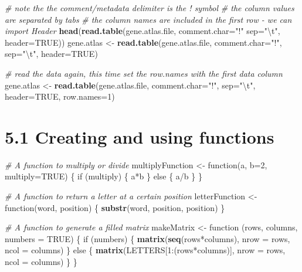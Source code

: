 \documentclass[a4paper]{book}
\newenvironment{Shaded}{\begin{snugshade}}{\end{snugshade}}
\newcommand{\KeywordTok}[1]{\textcolor[rgb]{0.13,0.29,0.53}{\textbf{{#1}}}}
\newcommand{\DataTypeTok}[1]{\textcolor[rgb]{0.13,0.29,0.53}{{#1}}}
\newcommand{\DecValTok}[1]{\textcolor[rgb]{0.00,0.00,0.81}{{#1}}}
\newcommand{\CharTok}[1]{\textcolor[rgb]{0.31,0.60,0.02}{{#1}}}
\newcommand{\StringTok}[1]{\textcolor[rgb]{0.31,0.60,0.02}{{#1}}}
\newcommand{\CommentTok}[1]{\textcolor[rgb]{0.56,0.35,0.01}{\textit{{#1}}}}
\newcommand{\OtherTok}[1]{\textcolor[rgb]{0.56,0.35,0.01}{{#1}}}
\newcommand{\NormalTok}[1]{{#1}}
\renewenvironment{Shaded}
{\vspace{1.5em}\begin{leftbar}\begin{snugshade}}
{\end{snugshade}\end{leftbar}\vspace{3pt}}
\begin{document}
\begin{Shaded}
\begin{Highlighting}[]
\CommentTok{# note the the comment/metadata delimiter is the ! symbol}
\CommentTok{# the column values are separated by tabs}
\CommentTok{# the column names are included in the first row - we can import Header}
\KeywordTok{head}\NormalTok{(}\KeywordTok{read.table}\NormalTok{(gene.atlas.file, }\DataTypeTok{comment.char=}\StringTok{"!"} \DataTypeTok{sep=}\StringTok{"}\CharTok{\textbackslash{}t}\StringTok{"}\NormalTok{, }\DataTypeTok{header=}\OtherTok{TRUE}\NormalTok{))}
\NormalTok{gene.atlas <-}\StringTok{ }\KeywordTok{read.table}\NormalTok{(gene.atlas.file, }\DataTypeTok{comment.char=}\StringTok{"!"}\NormalTok{, }\DataTypeTok{sep=}\StringTok{"}\CharTok{\textbackslash{}t}\StringTok{"}\NormalTok{, }\DataTypeTok{header=}\OtherTok{TRUE}\NormalTok{)}

\CommentTok{# read the data again, this time set the row.names with the first data column}
\NormalTok{gene.atlas <-}\StringTok{ }\KeywordTok{read.table}\NormalTok{(gene.atlas.file, }\DataTypeTok{comment.char=}\StringTok{"!"}\NormalTok{, }\DataTypeTok{sep=}\StringTok{"}\CharTok{\textbackslash{}t}\StringTok{"}\NormalTok{,}
                         \DataTypeTok{header=}\OtherTok{TRUE}\NormalTok{, }\DataTypeTok{row.names=}\DecValTok{1}\NormalTok{)}
\end{Highlighting}
\end{Shaded}

\section*{5.1 Creating and using
functions}\label{creating-and-using-functions}

\begin{Shaded}
\begin{Highlighting}[]
\CommentTok{# A function to multiply or divide}
\NormalTok{multiplyFunction <-}\StringTok{ }\NormalTok{function(a, }\DataTypeTok{b=}\DecValTok{2}\NormalTok{, }\DataTypeTok{multiply=}\OtherTok{TRUE}\NormalTok{) \{}
  \NormalTok{if (multiply) \{}
    \NormalTok{a*b}
  \NormalTok{\} else \{}
    \NormalTok{a/b}
  \NormalTok{\}}
\NormalTok{\}}

\CommentTok{# A function to return a letter at a certain position}
\NormalTok{letterFunction <-}\StringTok{ }\NormalTok{function(word, position) \{}
  \KeywordTok{substr}\NormalTok{(word, position, position)}
\NormalTok{\}}

\CommentTok{# A function to generate a filled matrix}
\NormalTok{makeMatrix <-}\StringTok{ }\NormalTok{function (rows, columns, }\DataTypeTok{numbers =} \OtherTok{TRUE}\NormalTok{) \{}
  \NormalTok{if (numbers) \{}
    \KeywordTok{matrix}\NormalTok{(}\KeywordTok{seq}\NormalTok{(rows*columns), }\DataTypeTok{nrow =} \NormalTok{rows, }\DataTypeTok{ncol =} \NormalTok{columns)}
  \NormalTok{\} else \{}
    \KeywordTok{matrix}\NormalTok{(LETTERS[}\DecValTok{1}\NormalTok{:(rows*columns)], }\DataTypeTok{nrow =} \NormalTok{rows, }\DataTypeTok{ncol =} \NormalTok{columns)}
  \NormalTok{\}}
\NormalTok{\}}
\end{Highlighting}
\end{Shaded}
\end{document}
